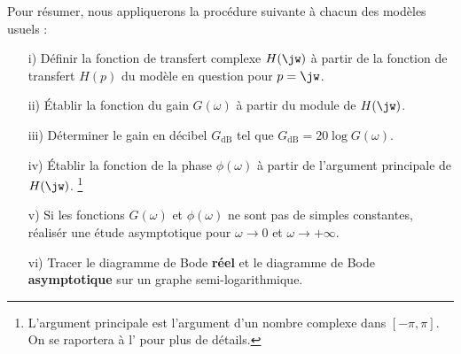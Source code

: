 Pour résumer, nous appliquerons la procédure suivante à chacun des modèles 
usuels :
\begin{itemize}
    \item[i)] Définir la fonction de transfert complexe $H(\jw)$ à partir de la 
          fonction de transfert $H(p)$ du modèle en question pour $p=\jw$.
    \item[ii)] \'Etablir la fonction du gain $G(\omega)$ à partir du 
          module de $H(\jw)$.
    \item[iii)] Déterminer le gain en décibel $G_{\si{\dB}}$ tel que 
        $G_{\si{\dB}}=20\log{G(\omega)}$.
    \item[iv)] \'Etablir la fonction de la phase $\phi(\omega)$ à partir de 
        l'argument principale de $H(\jw)$.
        \footnote{L'argument principale est l'argument d'un nombre complexe 
        dans $[-\pi,\pi]$. On se raportera à l' pour plus 
        de détails.}
    \item[v)] Si les fonctions $G(\omega)$ et $\phi(\omega)$ ne sont pas de 
          simples constantes, réalisér une étude
          asymptotique pour $\omega\rightarrow 0$ et 
          $\omega\rightarrow +\infty$.
    \item[vi)] Tracer le diagramme de Bode \textbf{réel} et le diagramme 
          de Bode \textbf{asymptotique} sur un graphe semi-logarithmique.
\end{itemize}
\newpage

